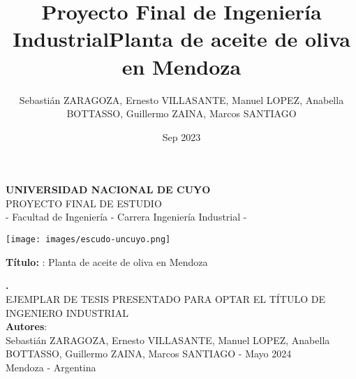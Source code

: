 \documentclass[12pt,a4paper,oneside]{book}
\title{Proyecto Final de Ingeniería Industrial}
\author{Sebastián ZARAGOZA, Ernesto VILLASANTE, Manuel LOPEZ, Anabella BOTTASSO, Guillermo ZAINA, Marcos SANTIAGO}
\date{Sep 2023}
\begin{document}

\marginsize{3.0cm}{3.0cm}{4.0cm}{3.0cm}
\renewcommand*{\contentsname}{ÍNDICE}
\renewcommand*{\listtablename}{Índice de tablas}
\renewcommand*{\listfigurename}{Índice de figuras}
\renewcommand{\baselinestretch}{1.0}
\renewcommand{\appendixname}{Anexos}
\renewcommand{\appendixtocname}{Anexos}
\renewcommand{\appendixpagename}{Anexos}
\renewcommand{\thetable}{\arabic{chapter}.\arabic{table}}
\renewcommand*{\tablename}{Tabla}
\renewcommand*{\chaptername}{Capítulo}
\renewcommand*{\thechapter}{\Roman{chapter}}
\renewcommand{\thesection}{\arabic{chapter}.\arabic{section}}
\renewcommand{\figurename}{Figura}
\renewcommand{\thefigure}{\arabic{chapter}.\arabic{figure}}
\renewcommand{\theequation}{\arabic{chapter}.\arabic{equation}}




\begin{titlepage}
 
\begin{center}
 
 {\huge \bf UNIVERSIDAD NACIONAL DE CUYO}\\[1.2cm]
 
{\Large PROYECTO FINAL DE ESTUDIO}\\{\Large  -  Facultad de Ingeniería - Carrera Ingeniería Industrial -}\\[2.0cm]


\begin{center}
\texttt{[image: images/escudo-uncuyo.png]}
\end{center}

\vspace{1.7cm}
{{\bf Título: }: }Planta de aceite de oliva en Mendoza
\title{Planta de aceite de oliva en Mendoza} %
{\bf \large . }\\[1.7cm] %


{EJEMPLAR DE TESIS PRESENTADO PARA OPTAR EL TÍTULO DE INGENIERO INDUSTRIAL}\\[0.5cm]
 
{{\bf Autores}: }\\[0.5cm] %

{\large Sebastián ZARAGOZA, Ernesto VILLASANTE, Manuel LOPEZ, Anabella BOTTASSO, Guillermo ZAINA, Marcos SANTIAGO - Mayo 2024}\\[0.8cm] %
{Mendoza - Argentina}
\end{center}

\end{titlepage}
\end{document}
